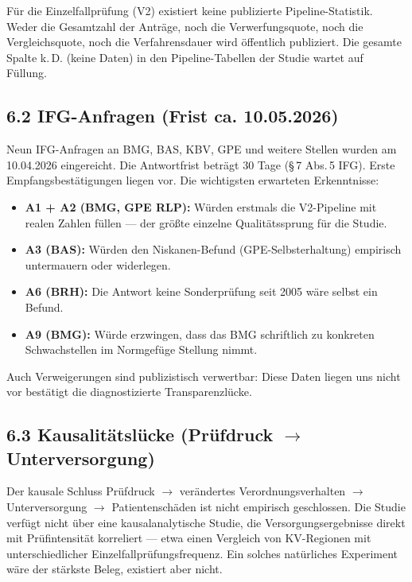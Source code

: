 \documentclass{umbruch-position}
\begin{document}
F\"ur die Einzelfallpr\"ufung (V2) existiert keine publizierte Pipeline-Statistik. Weder die Gesamtzahl der Antr\"age, noch die Verwerfungsquote, noch die Vergleichsquote, noch die Verfahrensdauer wird \"offentlich publiziert. Die gesamte Spalte \glqq{}k.\,D.\grqq{} (keine Daten) in den Pipeline-Tabellen der Studie wartet auf F\"ullung.

\subsection*{6.2 IFG-Anfragen (Frist ca. 10.05.2026)}

Neun IFG-Anfragen an BMG, BAS, KBV, GPE und weitere Stellen wurden am 10.04.2026 eingereicht. Die Antwortfrist betr\"agt 30 Tage (\S\,7 Abs.\,5 IFG). Erste Empfangsbest\"atigungen liegen vor. Die wichtigsten erwarteten Erkenntnisse:

\begin{itemize}
  \item \textbf{A1 + A2 (BMG, GPE RLP):} W\"urden erstmals die V2-Pipeline mit realen Zahlen f\"ullen --- der \glqq{}gr\"o\ss{}te einzelne Qualit\"atssprung\grqq{} f\"ur die Studie.
  \item \textbf{A3 (BAS):} W\"urden den Niskanen-Befund (GPE-Selbsterhaltung) empirisch untermauern oder widerlegen.
  \item \textbf{A6 (BRH):} Die Antwort \glqq{}keine Sonderpr\"ufung seit 2005\grqq{} w\"are selbst ein Befund.
  \item \textbf{A9 (BMG):} W\"urde erzwingen, dass das BMG schriftlich zu konkreten Schwachstellen im Normgef\"uge Stellung nimmt.
\end{itemize}

Auch Verweigerungen sind publizistisch verwertbar: \glqq{}Diese Daten liegen uns nicht vor\grqq{} best\"atigt die diagnostizierte Transparenzl\"ucke.

\subsection*{6.3 Kausalit\"atsl\"ucke (Pr\"ufdruck $\to$ Unterversorgung)}

Der kausale Schluss \glqq{}Pr\"ufdruck $\to$ ver\"andertes Verordnungsverhalten $\to$ Unterversorgung $\to$ Patientensch\"aden\grqq{} ist nicht empirisch geschlossen. Die Studie verf\"ugt nicht \"uber eine kausalanalytische Studie, die Versorgungsergebnisse direkt mit Pr\"ufintensit\"at korreliert --- etwa einen Vergleich von KV-Regionen mit unterschiedlicher Einzelfallpr\"ufungsfrequenz. Ein solches nat\"urliches Experiment w\"are der st\"arkste Beleg, existiert aber nicht.
\end{document}
